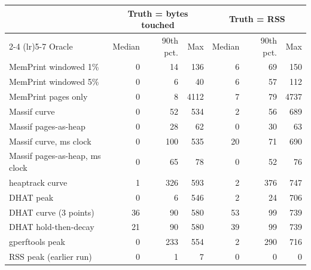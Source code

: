 \begin{tabular}{lrrrrrr}
\toprule
 & \multicolumn{3}{c}{Truth = bytes touched} & \multicolumn{3}{c}{Truth = RSS} \\
\cmidrule(lr){2-4} \cmidrule(lr){5-7}
Oracle & Median & 90th pct. & Max & Median & 90th pct. & Max \\
\midrule
MemPrint windowed 1\% & 0 & 14 & 136 & 6 & 69 & 150 \\
MemPrint windowed 5\% & 0 & 6 & 40 & 6 & 57 & 112 \\
MemPrint pages only & 0 & 8 & 4112 & 7 & 79 & 4737 \\
Massif curve & 0 & 52 & 534 & 2 & 56 & 689 \\
Massif pages-as-heap & 0 & 28 & 62 & 0 & 30 & 63 \\
Massif curve, ms clock & 0 & 100 & 535 & 20 & 71 & 690 \\
Massif pages-as-heap, ms clock & 0 & 65 & 78 & 0 & 52 & 76 \\
heaptrack curve & 1 & 326 & 593 & 2 & 376 & 747 \\
DHAT peak & 0 & 6 & 546 & 2 & 24 & 706 \\
DHAT curve (3 points) & 36 & 90 & 580 & 53 & 99 & 739 \\
DHAT hold-then-decay & 21 & 90 & 580 & 39 & 99 & 739 \\
gperftools peak & 0 & 233 & 554 & 2 & 290 & 716 \\
RSS peak (earlier run) & 0 & 1 & 7 & 0 & 0 & 0 \\
\bottomrule
\end{tabular}
